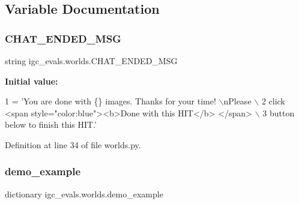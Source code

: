 \subsection{Variable Documentation}
\mbox{\label{namespaceigc__evals_1_1worlds_a8aebbb7ac60c28b9bef3856df7f7e3f3}} 
\subsubsection{\texorpdfstring{C\+H\+A\+T\+\_\+\+E\+N\+D\+E\+D\+\_\+\+M\+SG}{CHAT\_ENDED\_MSG}}
{\footnotesize\ttfamily string igc\+\_\+evals.\+worlds.\+C\+H\+A\+T\+\_\+\+E\+N\+D\+E\+D\+\_\+\+M\+SG}

{\bfseries Initial value\+:}
\begin{DoxyCode}
1 =  \textcolor{stringliteral}{'You are done with \{\} images. Thanks for your time! \(\backslash\)nPlease \(\backslash\)}
2 \textcolor{stringliteral}{        click <span style="color:blue"><b>Done with this HIT</b> </span> \(\backslash\)}
3 \textcolor{stringliteral}{        button below to finish this HIT.'}
\end{DoxyCode}


Definition at line 34 of file worlds.\+py.

\mbox{\label{namespaceigc__evals_1_1worlds_aba6e8d2d313654e091b536802175a768}} 
\subsubsection{\texorpdfstring{demo\+\_\+example}{demo\_example}}
{\footnotesize\ttfamily dictionary igc\+\_\+evals.\+worlds.\+demo\+\_\+example}

